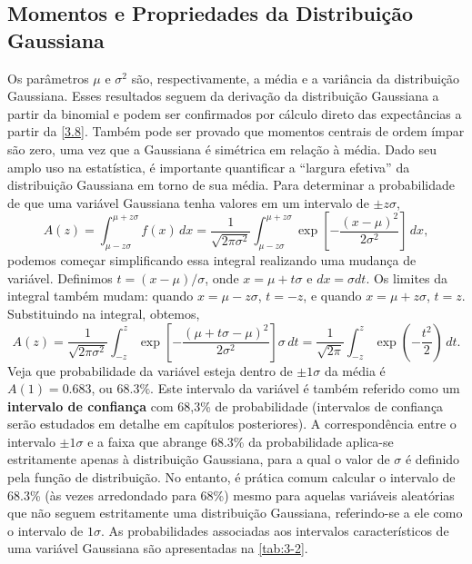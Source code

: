 \subsection{Momentos e Propriedades da Distribuição Gaussiana}

Os parâmetros $\mu$ e $\sigma^2$ são, respectivamente, a média e a variância da distribuição Gaussiana. Esses resultados seguem da derivação da distribuição Gaussiana a partir da binomial e podem ser confirmados por cálculo direto das expectâncias a partir da \autoref{3.8}. Também pode ser provado que momentos centrais de ordem ímpar são zero, uma vez que a Gaussiana é simétrica em relação à média. Dado seu amplo uso na estatística, é importante quantificar a ``largura efetiva'' da distribuição Gaussiana em torno de sua média. Para determinar a probabilidade de que uma variável Gaussiana tenha valores em um intervalo de $\pm z\sigma$,
\begin{equation*}
A(z) = \int_{\mu - z \sigma}^{\mu + z \sigma} f(x) \, dx = \dfrac{1}{\sqrt{2\pi\sigma^2}} \int_{\mu - z \sigma}^{\mu + z \sigma}  \exp\left[-\dfrac{(x - \mu)^2}{2\sigma^2}\right] \, dx,
\end{equation*}
podemos começar simplificando essa integral realizando uma mudança de variável. Definimos $t = (x - \mu) / \sigma$, onde $x = \mu + t\sigma$ e $dx = \sigma dt$. Os limites da integral também mudam: quando $x = \mu - z\sigma$, $t = -z$, e quando $x = \mu + z\sigma$, $t = z$. Substituindo na integral, obtemos,
\begin{equation}
A(z) = \dfrac{1}{\sqrt{2\pi\sigma^2}} \int_{-z}^{z} \exp\left[-\dfrac{(\mu + t\sigma - \mu)^2}{2\sigma^2}\right] \sigma \,dt = \dfrac{1}{\sqrt{2\pi}} \int_{-z}^{z} \exp\left(-\dfrac{t^2}{2}\right) \, dt.
\end{equation}
Veja que probabilidade da variável esteja dentro de $\pm 1\sigma$ da média é $A(1) = 0.683$, ou $68.3\%$. Este intervalo da variável é também referido como um \textbf{intervalo de confiança} com 68,3\% de probabilidade (intervalos de confiança serão estudados em detalhe em capítulos posteriores). A correspondência entre o intervalo $\pm 1\sigma$ e a faixa que abrange 68.3\% da probabilidade aplica-se estritamente apenas à distribuição Gaussiana, para a qual o valor de $\sigma$ é definido pela função de distribuição. No entanto, é prática comum calcular o intervalo de 68.3\% (às vezes arredondado para 68\%) mesmo para aquelas variáveis aleatórias que não seguem estritamente uma distribuição Gaussiana, referindo-se a ele como o intervalo de $1\sigma$. As probabilidades associadas aos intervalos característicos de uma variável Gaussiana são apresentadas na \autoref{tab:3-2}.

